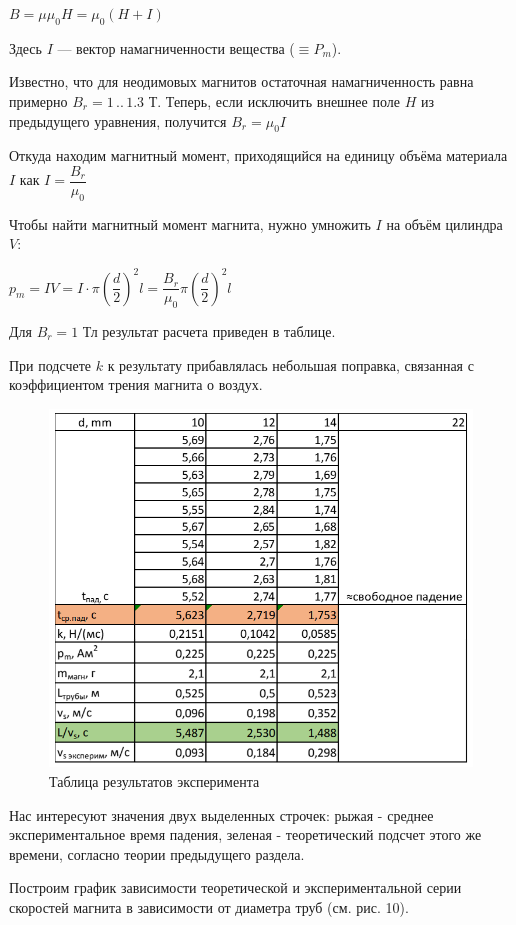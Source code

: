 \documentclass[a4paper,12pt]{article} %
\begin{document}
$B = \mu \mu_0 H  = \mu_0(H + I)$

Здесь $I$ — вектор намагниченности вещества ($\equiv P_m$).

Известно, что для неодимовых магнитов остаточная намагниченность равна примерно $B_r = 1\,..\,1.3$ Т. Теперь, если исключить внешнее поле $H$ из предыдущего уравнения, получится
$B_r = \mu_0I$

Откуда находим магнитный момент, приходящийся на единицу объёма материала $I$ как
$I = \dfrac{B_r}{\mu_0}$

Чтобы найти магнитный момент магнита, нужно умножить $I$ на объём цилиндра $V$:

$p_m=IV=I\cdot\pi\left(\dfrac{d}{2}\right)^2 l = \dfrac{B_r}{\mu_0}\pi\left(\dfrac{d}{2}\right)^2 l$

Для $B_r = 1$ Тл результат расчета приведен в таблице.

При подсчете $k$ к результату прибавлялась небольшая поправка, связанная с коэффициентом трения магнита о воздух.

\begin{figure}[h!]
	\centering
	\includegraphics[scale=0.58]{фейл.png}
	\caption{Таблица результатов эксперимента}
\end{figure}

Нас интересуют значения двух выделенных строчек: рыжая - среднее экспериментальное время падения, зеленая - теоретический подсчет этого же времени, согласно теории предыдущего раздела.

Построим график зависимости теоретической и экспериментальной серии скоростей магнита в зависимости от диаметра труб (см. рис. 10).
\end{document}
